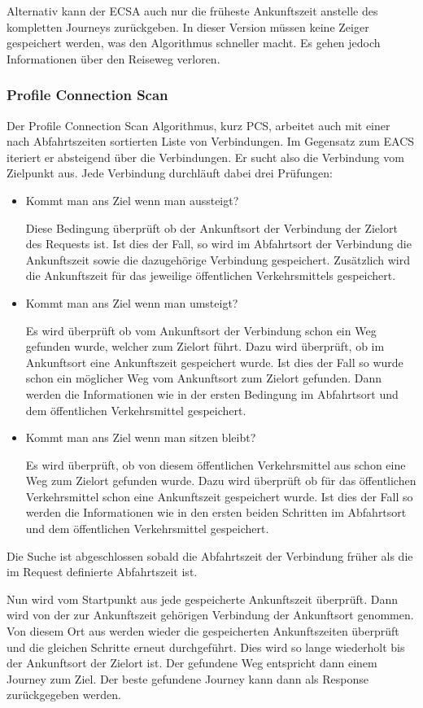 Alternativ kann der ECSA auch nur die früheste Ankunftszeit anstelle des kompletten Journeys zurückgeben. In dieser Version müssen keine Zeiger gespeichert werden, was den Algorithmus schneller macht. Es gehen jedoch Informationen über den Reiseweg verloren.

\subsubsection{Profile Connection Scan}
Der Profile Connection Scan Algorithmus, kurz PCS, arbeitet auch mit einer nach Abfahrtszeiten sortierten Liste von Verbindungen. Im Gegensatz zum EACS iteriert er absteigend über die Verbindungen. Er sucht also die Verbindung vom Zielpunkt aus. Jede Verbindung durchläuft dabei drei Prüfungen:

\begin{itemize}
	\item Kommt man ans Ziel wenn man aussteigt?
	
	Diese Bedingung überprüft ob der Ankunftsort der Verbindung der Zielort des Requests ist. Ist dies der Fall, so wird im Abfahrtsort der Verbindung die Ankunftszeit sowie die dazugehörige Verbindung gespeichert. Zusätzlich wird die Ankunftszeit für das jeweilige öffentlichen Verkehrsmittels gespeichert.
	\item Kommt man ans Ziel wenn man umsteigt?
	
	Es wird überprüft ob vom Ankunftsort der Verbindung schon ein Weg gefunden wurde, welcher zum Zielort führt. Dazu wird überprüft, ob im Ankunftsort eine Ankunftszeit gespeichert wurde. Ist dies der Fall so wurde schon ein möglicher Weg vom Ankunftsort zum Zielort gefunden. Dann werden die Informationen wie in der ersten Bedingung im Abfahrtsort und dem öffentlichen Verkehrsmittel gespeichert.
	\item Kommt man ans Ziel wenn man sitzen bleibt?
	
	Es wird überprüft, ob von diesem öffentlichen Verkehrsmittel aus schon eine Weg zum Zielort gefunden wurde. Dazu wird überprüft ob für das öffentlichen Verkehrsmittel schon eine Ankunftszeit gespeichert wurde. Ist dies der Fall so werden die Informationen wie in den ersten beiden Schritten im Abfahrtsort und dem öffentlichen Verkehrsmittel gespeichert.
\end{itemize}
Die Suche ist abgeschlossen sobald die Abfahrtszeit der Verbindung früher als die im Request definierte Abfahrtszeit ist. 

Nun wird vom Startpunkt aus jede gespeicherte Ankunftszeit überprüft. Dann wird von der zur Ankunftszeit gehörigen Verbindung der Ankunftsort genommen. Von diesem Ort aus werden wieder die gespeicherten Ankunftszeiten überprüft und die gleichen Schritte erneut durchgeführt. Dies wird so lange wiederholt bis der Ankunftsort der Zielort ist. Der gefundene Weg entspricht dann einem Journey zum Ziel. Der beste gefundene Journey kann dann als Response zurückgegeben werden. 
